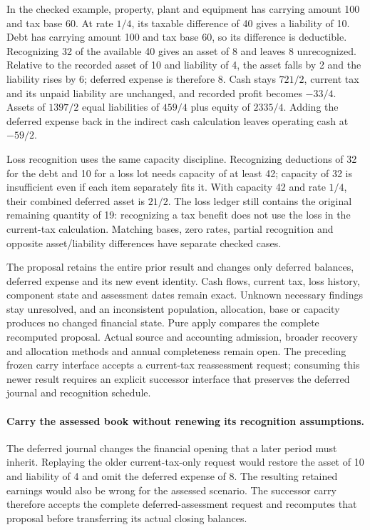 In the checked example, property, plant and equipment has carrying amount 100
and tax base 60. At rate $1/4$, its taxable difference of 40 gives a liability
of 10. Debt has carrying amount 100 and tax base 60, so its difference is
deductible. Recognizing 32 of the available 40 gives an asset of 8 and leaves 8
unrecognized. Relative to the recorded asset of 10 and liability of 4, the asset
falls by 2 and the liability rises by 6; deferred expense is therefore 8.
Cash stays $721/2$, current tax and its unpaid liability are unchanged, and
recorded profit becomes $-33/4$. Assets of $1397/2$ equal liabilities of $459/4$
plus equity of $2335/4$. Adding the deferred expense back in the indirect cash
calculation leaves operating cash at $-59/2$.

Loss recognition uses the same capacity discipline. Recognizing deductions of
32 for the debt and 10 for a loss lot needs capacity of at least 42; capacity
of 32 is insufficient even if each item separately fits it. With capacity 42
and rate $1/4$, their combined deferred asset is $21/2$. The loss ledger still
contains the original remaining quantity of 19: recognizing a tax benefit does
not use the loss in the current-tax calculation. Matching bases, zero rates,
partial recognition and opposite asset/liability differences have separate
checked cases.

The proposal retains the entire prior result and changes only deferred balances,
deferred expense and its new event identity. Cash flows, current tax, loss
history, component state and assessment dates remain exact. Unknown necessary
findings stay unresolved, and an inconsistent population, allocation, base or
capacity produces no changed financial state. Pure apply compares the complete
recomputed proposal. Actual source and accounting admission, broader recovery
and allocation methods and annual completeness remain open. The preceding
frozen carry interface accepts a current-tax reassessment request; consuming
this newer result requires an explicit successor interface that preserves the
deferred journal and recognition schedule.


\paragraph{Carry the assessed book without renewing its recognition assumptions.}
The deferred journal changes the financial opening that a later period must
inherit. Replaying the older current-tax-only request would restore the asset
of 10 and liability of 4 and omit the deferred expense of 8. The resulting
retained earnings would also be wrong for the assessed scenario. The successor
carry therefore accepts the complete deferred-assessment request and recomputes
that proposal before transferring its actual closing balances.

